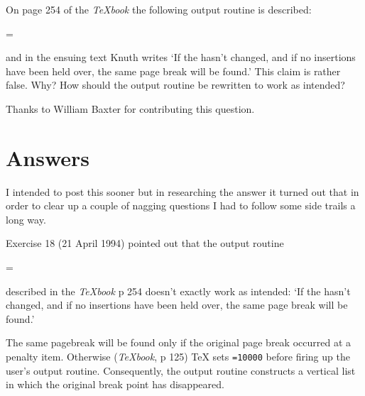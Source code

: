 
On page 254 of the \emph{TeXbook} the following output routine is described:
\begin{lcode}
	\output={ \penalty\outputpenalty}
\end{lcode}
and in the ensuing text Knuth writes `If the \cmd{\vsize} hasn't changed, and
if no insertions have been held over, the same page break will be
found.' This claim is rather false. Why? How should the output routine
be rewritten to work as intended?

Thanks to William Baxter
for contributing this question.

\begin{comment}
Michael Downes %
mjd@math.ams.org (Internet) ASCII 32--54,55--126: !"#$%
789:;<=>?@ABCDEFGHIJKLMNOPQRSTUVWXYZ[\]^_`abcdefghijklmnopqrstuvwxyz{|}~
\end{comment}


\section{Answers}

\begin{comment}
Date: 27 May 1994 08:19:39 -0400 (EDT)
From: Michael Downes <MJD@MATH.AMS.ORG>
Subject: Around the Bend #18, answer
To: info-tex@shsu.edu
\end{comment}


I intended to post this sooner but in researching the answer it turned
out that in order to clear up a couple of nagging questions I had to
follow some side trails a long way.


Exercise 18 (21 April 1994) pointed out that the output routine
\begin{lcode}
	\output={ \penalty\outputpenalty}
\end{lcode}
described in the \emph{TeXbook} p 254 doesn't exactly work as intended: `If
the \cmd{\vsize} hasn't changed, and if no insertions have been held over, the
same page break will be found.'

The same pagebreak will be found only if the original page break
occurred at a penalty item. Otherwise (\emph{TeXbook}, p 125) TeX
sets \cmd{\outputpenalty}\texttt{=10000} before firing up the user's output
routine. Consequently, the output routine constructs a vertical list in
which the original break point has disappeared.

